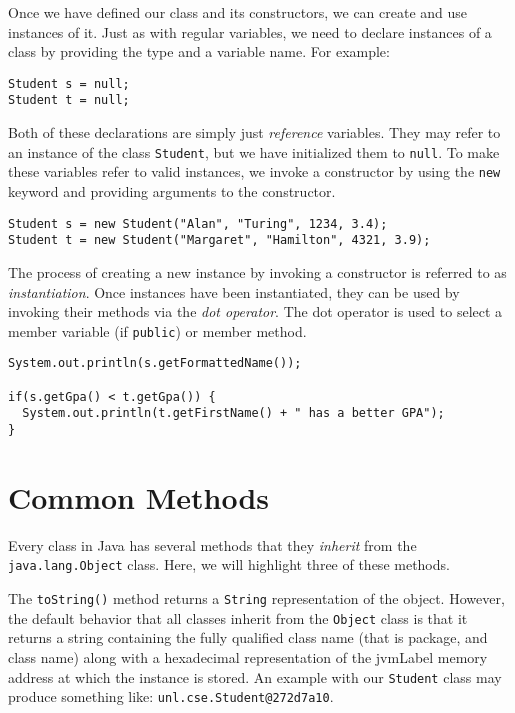 Once we have defined our class and its constructors, we can 
create and use instances of it.  Just as with regular variables, 
we need to declare instances of a class by providing the type
and a variable name.  For example:

\begin{verbatim}
Student s = null;
Student t = null;
\end{verbatim}

Both of these declarations are simply just \emph{reference} variables.
They may refer to an instance of the class \texttt{Student}, but
we have initialized them to \texttt{null}.  To make
these variables refer to valid instances, we invoke a constructor
by using the \texttt{new} keyword and providing arguments
to the constructor.

\begin{verbatim}
Student s = new Student("Alan", "Turing", 1234, 3.4);
Student t = new Student("Margaret", "Hamilton", 4321, 3.9);
\end{verbatim}

The process of creating a new instance by invoking a constructor is
referred to as \emph{instantiation}.  Once instances have been instantiated,
they can be used by invoking their methods via the \emph{dot operator}.
The dot operator is used to select a member variable (if 
\texttt{public}) or member method.

\begin{verbatim}
System.out.println(s.getFormattedName());

if(s.getGpa() < t.getGpa()) {
  System.out.println(t.getFirstName() + " has a better GPA");
}
\end{verbatim}

\section{Common Methods}
\label{section:javaCommonMethods}

Every class in Java has several methods that they \emph{inherit} 
from the \texttt{java.lang.Object} class.  Here, we will 
highlight three of these methods.

The \texttt{toString()} method returns a \texttt{String}
representation of the object.  However, the default behavior that all
classes inherit from the \texttt{Object} class is that it
returns a string containing the fully qualified class name 
(that is package, and class name) along with a \gls{hexadecimal}
representation of the \gls{jvmLabel} memory address at which the
instance is stored.  An example with our \texttt{Student}
class may produce something like: \texttt{unl.cse.Student@272d7a10}.

